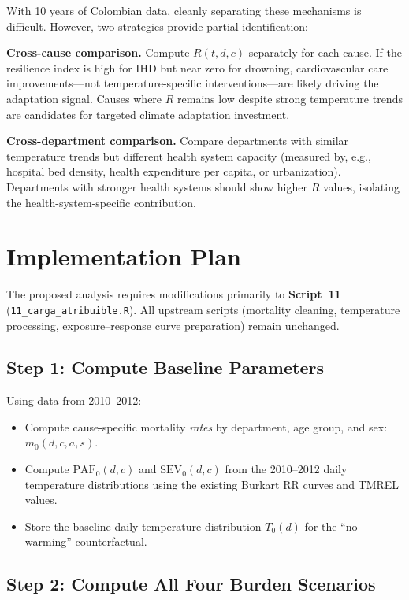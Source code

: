 \documentclass[11pt,a4paper]{article}
\begin{document}
With 10 years of Colombian data, cleanly separating these mechanisms is difficult. However, two strategies provide partial identification:

\textbf{Cross-cause comparison.} Compute $R(t,d,c)$ separately for each cause. If the resilience index is high for IHD but near zero for drowning, cardiovascular care improvements---not temperature-specific interventions---are likely driving the adaptation signal. Causes where $R$ remains low despite strong temperature trends are candidates for targeted climate adaptation investment.

\textbf{Cross-department comparison.} Compare departments with similar temperature trends but different health system capacity (measured by, e.g., hospital bed density, health expenditure per capita, or urbanization). Departments with stronger health systems should show higher $R$ values, isolating the health-system-specific contribution.

\section{Implementation Plan}

The proposed analysis requires modifications primarily to \textbf{Script~11} (\texttt{11\_carga\_atribuible.R}). All upstream scripts (mortality cleaning, temperature processing, exposure--response curve preparation) remain unchanged.

\subsection{Step 1: Compute Baseline Parameters}

Using data from 2010--2012:
\begin{itemize}[nosep]
  \item Compute cause-specific mortality \emph{rates} by department, age group, and sex: $m_0(d,c,a,s)$.
  \item Compute $\text{PAF}_0(d,c)$ and $\text{SEV}_0(d,c)$ from the 2010--2012 daily temperature distributions using the existing Burkart RR curves and TMREL values.
  \item Store the baseline daily temperature distribution $T_0(d)$ for the ``no warming'' counterfactual.
\end{itemize}

\subsection{Step 2: Compute All Four Burden Scenarios}
\end{document}
